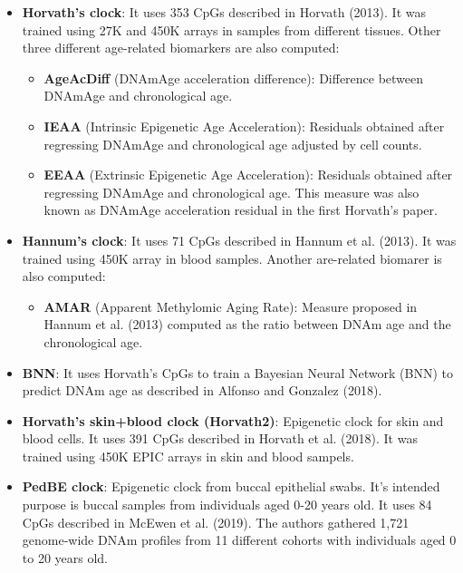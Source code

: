 \documentclass[]{article}
\providecommand{\tightlist}{%
  \setlength{\itemsep}{0pt}\setlength{\parskip}{0pt}}
\begin{document}
\begin{itemize}
\tightlist
\item
  \textbf{Horvath's clock}: It uses 353 CpGs described in Horvath (2013). It was trained using 27K and 450K arrays in samples from different tissues. Other three different age-related biomarkers are also computed:

  \begin{itemize}
  \tightlist
  \item
    \textbf{AgeAcDiff} (DNAmAge acceleration difference): Difference between DNAmAge and chronological age.
  \item
    \textbf{IEAA} (Intrinsic Epigenetic Age Acceleration): Residuals obtained after regressing DNAmAge and chronological age adjusted by cell counts.\\
  \item
    \textbf{EEAA} (Extrinsic Epigenetic Age Acceleration): Residuals obtained after regressing DNAmAge and chronological age. This measure was also known as DNAmAge acceleration residual in the first Horvath's paper.
  \end{itemize}
\item
  \textbf{Hannum's clock}: It uses 71 CpGs described in Hannum et al. (2013). It was trained using 450K array in blood samples. Another are-related biomarer is also computed:

  \begin{itemize}
  \tightlist
  \item
    \textbf{AMAR} (Apparent Methylomic Aging Rate): Measure proposed in Hannum et al. (2013) computed as the ratio between DNAm age and the chronological age.
  \end{itemize}
\item
  \textbf{BNN}: It uses Horvath's CpGs to train a Bayesian Neural Network (BNN) to predict DNAm age as described in Alfonso and Gonzalez (2018).
\item
  \textbf{Horvath's skin+blood clock (Horvath2)}: Epigenetic clock for skin and blood cells. It uses 391 CpGs described in Horvath et al. (2018). It was trained using 450K EPIC arrays in skin and blood sampels.
\item
  \textbf{PedBE clock}: Epigenetic clock from buccal epithelial swabs. It's intended purpose is buccal samples from individuals aged 0-20 years old. It uses 84 CpGs described in McEwen et al. (2019). The authors gathered 1,721 genome-wide DNAm profiles from 11 different cohorts with individuals aged 0 to 20 years old.
\end{itemize}
\end{document}
